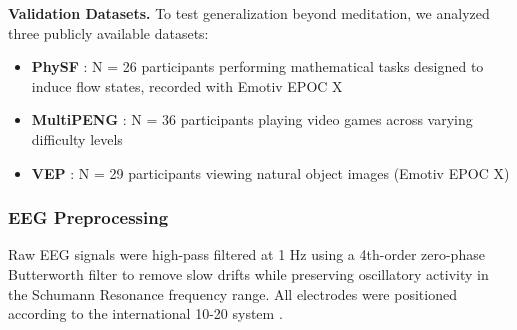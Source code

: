 \documentclass[11pt,a4paper]{article}
\begin{document}
\textbf{Validation Datasets.}
To test generalization beyond meditation, we analyzed three publicly available datasets:
\begin{itemize}
    \item \textbf{PhySF} \parencite{albuquerque2024physf}: N = 26 participants performing mathematical tasks designed to induce flow states, recorded with Emotiv EPOC X
    \item \textbf{MultiPENG} \parencite{albuquerque2023multimodal}: N = 36 participants playing video games across varying difficulty levels
    \item \textbf{VEP} \parencite{faisal2023eeg}: N = 29 participants viewing natural object images (Emotiv EPOC X)
\end{itemize}

\begin{table}[H]
\centering
\caption{Combined Dataset Characteristics}
\label{tab:dataset_summary}
\end{table}

\subsubsection{EEG Preprocessing}
Raw EEG signals were high-pass filtered at 1 Hz using a 4th-order zero-phase Butterworth filter \parencite{butterworth1930filter} to remove slow drifts while preserving oscillatory activity in the Schumann Resonance frequency range. All electrodes were positioned according to the international 10-20 system \parencite{jasper1958tentwenty}.
\end{document}
